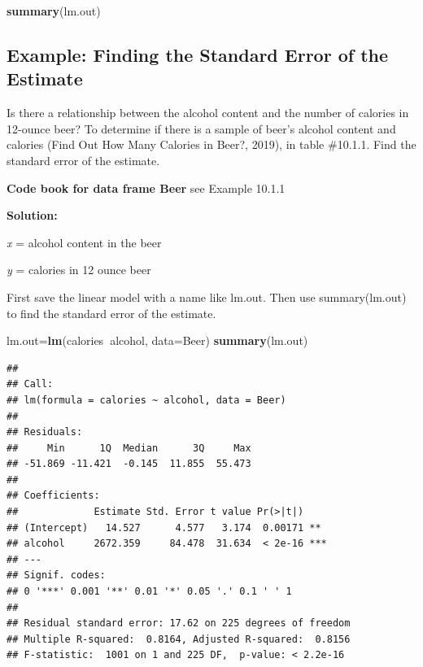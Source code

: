 \documentclass[
]{book}
\newenvironment{Shaded}{\begin{snugshade}}{\end{snugshade}}
\newcommand{\DataTypeTok}[1]{\textcolor[rgb]{0.13,0.29,0.53}{#1}}
\newcommand{\KeywordTok}[1]{\textcolor[rgb]{0.13,0.29,0.53}{\textbf{#1}}}
\newcommand{\NormalTok}[1]{#1}
\newcommand{\OperatorTok}[1]{\textcolor[rgb]{0.81,0.36,0.00}{\textbf{#1}}}
\begin{document}
\begin{Shaded}
\begin{Highlighting}[]
\KeywordTok{summary}\NormalTok{(lm.out)}
\end{Highlighting}
\end{Shaded}

\hypertarget{example-finding-the-standard-error-of-the-estimate}{%
\subsection{Example: Finding the Standard Error of the Estimate}\label{example-finding-the-standard-error-of-the-estimate}}

Is there a relationship between the alcohol content and the number of calories in 12-ounce beer? To determine if there is a sample of beer's alcohol content and calories (Find Out How Many Calories in Beer?, 2019), in table \#10.1.1. Find the standard error of the estimate.

\textbf{Code book for data frame Beer} see Example 10.1.1

\textbf{Solution:}

\emph{x} = alcohol content in the beer

\emph{y} = calories in 12 ounce beer

First save the linear model with a name like lm.out. Then use summary(lm.out) to find the standard error of the estimate.

\begin{Shaded}
\begin{Highlighting}[]
\NormalTok{lm.out=}\KeywordTok{lm}\NormalTok{(calories}\OperatorTok{~}\NormalTok{alcohol, }\DataTypeTok{data=}\NormalTok{Beer)}
\KeywordTok{summary}\NormalTok{(lm.out)}
\end{Highlighting}
\end{Shaded}

\begin{verbatim}
## 
## Call:
## lm(formula = calories ~ alcohol, data = Beer)
## 
## Residuals:
##     Min      1Q  Median      3Q     Max 
## -51.869 -11.421  -0.145  11.855  55.473 
## 
## Coefficients:
##             Estimate Std. Error t value Pr(>|t|)    
## (Intercept)   14.527      4.577   3.174  0.00171 ** 
## alcohol     2672.359     84.478  31.634  < 2e-16 ***
## ---
## Signif. codes:  
## 0 '***' 0.001 '**' 0.01 '*' 0.05 '.' 0.1 ' ' 1
## 
## Residual standard error: 17.62 on 225 degrees of freedom
## Multiple R-squared:  0.8164,	Adjusted R-squared:  0.8156 
## F-statistic:  1001 on 1 and 225 DF,  p-value: < 2.2e-16
\end{verbatim}
\end{document}
